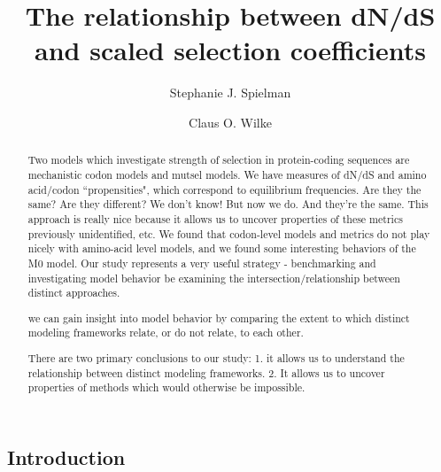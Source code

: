 \documentclass{pnastwo}
\begin{document}
	
	
\title{The relationship between dN/dS and scaled selection coefficients}

\author{Stephanie J. Spielman 
	\and
	Claus O. Wilke}


\maketitle
\begin{article}
	
\begin{abstract}
Two models which investigate strength of selection in protein-coding sequences are mechanistic codon models and mutsel models. We have measures of dN/dS and amino acid/codon ``propensities", which correspond to equilibrium frequencies. Are they the same? Are they different? We don't know! But now we do. And they're the same. This approach is really nice because it allows us to uncover properties of these metrics previously unidentified, etc. We found that codon-level models and metrics do not play nicely with amino-acid level models, and we found some interesting behaviors of the M0 model. Our study represents a very useful strategy - benchmarking and investigating model behavior be examining the intersection/relationship between distinct approaches.
  
  we can gain insight into model behavior by comparing the extent to which distinct modeling frameworks relate, or do not relate, to each other.
  
  
  There are two primary conclusions to our study: 1. it allows us to understand the relationship between distinct modeling frameworks. 2. It allows us to uncover properties of methods which would otherwise be impossible.

\end{abstract}


\section*{Introduction}


\end{article}
\end{document}
